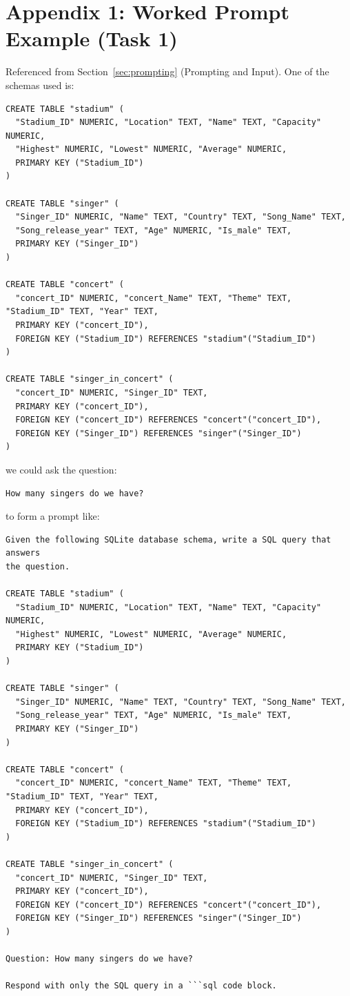 \documentclass[11pt]{article}
\begin{document}
\section*{Appendix 1: Worked Prompt Example (Task 1)}
\label{sec:appendix1}

Referenced from Section~\ref{sec:prompting} (Prompting and Input). One of the schemas used is:

\begin{verbatim}
CREATE TABLE "stadium" (
  "Stadium_ID" NUMERIC, "Location" TEXT, "Name" TEXT, "Capacity" NUMERIC,
  "Highest" NUMERIC, "Lowest" NUMERIC, "Average" NUMERIC,
  PRIMARY KEY ("Stadium_ID")
)

CREATE TABLE "singer" (
  "Singer_ID" NUMERIC, "Name" TEXT, "Country" TEXT, "Song_Name" TEXT,
  "Song_release_year" TEXT, "Age" NUMERIC, "Is_male" TEXT,
  PRIMARY KEY ("Singer_ID")
)

CREATE TABLE "concert" (
  "concert_ID" NUMERIC, "concert_Name" TEXT, "Theme" TEXT, "Stadium_ID" TEXT, "Year" TEXT,
  PRIMARY KEY ("concert_ID"),
  FOREIGN KEY ("Stadium_ID") REFERENCES "stadium"("Stadium_ID")
)

CREATE TABLE "singer_in_concert" (
  "concert_ID" NUMERIC, "Singer_ID" TEXT,
  PRIMARY KEY ("concert_ID"),
  FOREIGN KEY ("concert_ID") REFERENCES "concert"("concert_ID"),
  FOREIGN KEY ("Singer_ID") REFERENCES "singer"("Singer_ID")
)
\end{verbatim}

we could ask the question:
\begin{verbatim}
How many singers do we have?
\end{verbatim}

to form a prompt like:

\begin{verbatim}
Given the following SQLite database schema, write a SQL query that answers
the question.

CREATE TABLE "stadium" (
  "Stadium_ID" NUMERIC, "Location" TEXT, "Name" TEXT, "Capacity" NUMERIC,
  "Highest" NUMERIC, "Lowest" NUMERIC, "Average" NUMERIC,
  PRIMARY KEY ("Stadium_ID")
)

CREATE TABLE "singer" (
  "Singer_ID" NUMERIC, "Name" TEXT, "Country" TEXT, "Song_Name" TEXT,
  "Song_release_year" TEXT, "Age" NUMERIC, "Is_male" TEXT,
  PRIMARY KEY ("Singer_ID")
)

CREATE TABLE "concert" (
  "concert_ID" NUMERIC, "concert_Name" TEXT, "Theme" TEXT, "Stadium_ID" TEXT, "Year" TEXT,
  PRIMARY KEY ("concert_ID"),
  FOREIGN KEY ("Stadium_ID") REFERENCES "stadium"("Stadium_ID")
)

CREATE TABLE "singer_in_concert" (
  "concert_ID" NUMERIC, "Singer_ID" TEXT,
  PRIMARY KEY ("concert_ID"),
  FOREIGN KEY ("concert_ID") REFERENCES "concert"("concert_ID"),
  FOREIGN KEY ("Singer_ID") REFERENCES "singer"("Singer_ID")
)

Question: How many singers do we have?

Respond with only the SQL query in a ```sql code block.
\end{verbatim}
\end{document}
